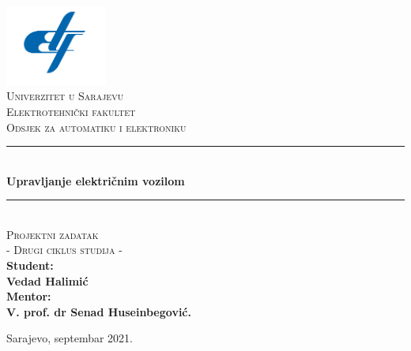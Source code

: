 \documentclass[12pt,oneside, a4paper]{book}
\newcommand{\HRule}{\rule{\linewidth}{0.5mm}}
\begin{document}

\frontmatter

\begin{titlepage}
\begin{center}

\includegraphics[width=0.25\textwidth]{etf-logo.png}~\\[0.1cm]
\textsc{\Large Univerzitet u Sarajevu}\\[0.2cm]  
\textsc{\Large Elektrotehnički fakultet}\\[0.2cm] 
\textsc{\Large Odsjek za automatiku i elektroniku}\\[3cm]\HRule \\[0.5cm] 
{\huge \bfseries Upravljanje električnim vozilom} \\[0.4cm] 
\HRule \\[0.5cm]

\textsc{\Large Projektni zadatak}\\[0.4cm]
\textsc{\Large - Drugi ciklus studija - }\\[1.5cm]

\textbf{ 
\Large Student:\\  
\Large Vedad Halimić\\[1cm]  
\Large Mentor: \\[0.2cm] 
\Large V. prof. dr Senad Huseinbegović.} 
\vfill

{\large Sarajevo, septembar 2021.}

\end{center} 
\end{titlepage}



%

%
\end{document}
